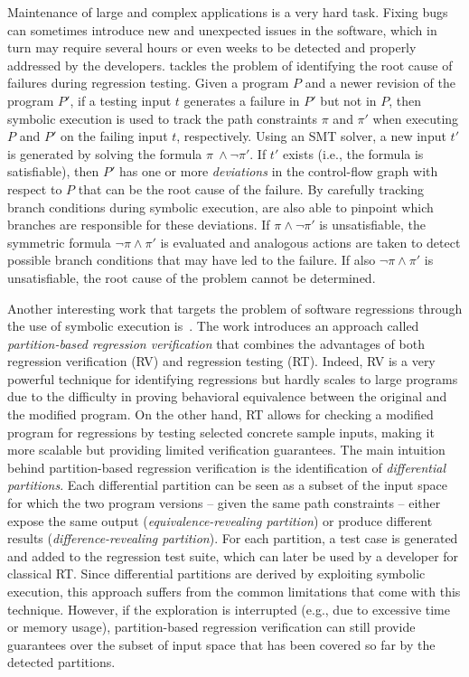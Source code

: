 \smallskip
Maintenance of large and complex applications is a very hard task. Fixing bugs can sometimes introduce new and unexpected issues in the software, which in turn may require several hours or even weeks to be detected and properly addressed by the developers. \cite{QRL-TOSEM12} tackles the problem of identifying the root cause of failures during regression testing. Given a program $P$ and a newer revision of the program $P'$, if a testing input $t$ generates a failure in $P'$ but not in  $P$, then symbolic execution is used to track the path constraints $\pi$ and $\pi'$ when executing $P$ and $P'$ on the failing input $t$, respectively. Using an SMT solver, a new input $t'$ is generated by solving the formula $\pi ~\wedge \neg\pi'$. If $t'$ exists (i.e., the formula is satisfiable), then $P'$ has one or more {\em deviations} in the control-flow graph with respect to $P$ that can be the root cause of the failure. By carefully tracking branch conditions during symbolic execution, \cite{QRL-TOSEM12} are also able to pinpoint which branches are responsible for these deviations. If $\pi \wedge \neg\pi'$ is unsatisfiable, the symmetric formula $\neg\pi \wedge \pi'$ is evaluated and analogous actions are taken to detect possible branch conditions that may have led to the failure. If also $\neg\pi \wedge \pi'$ is unsatisfiable, the root cause of the problem cannot be determined.

Another interesting work that targets the problem of software regressions through the use of symbolic execution is~\cite{BOR-ICSE13}. The work introduces an approach called {\em partition-based regression verification} that combines the advantages of both regression verification (RV) and regression testing (RT). Indeed, RV is a very powerful technique for identifying regressions but hardly scales to large programs due to the difficulty in proving behavioral equivalence between the original and the modified program. On the other hand, RT allows for checking a modified program for regressions by testing selected concrete sample inputs, making it more scalable but providing limited verification guarantees. The main intuition behind partition-based regression verification is the identification of {\em differential partitions}. Each differential partition can be seen as a subset of the input space for which the two program versions -- given the same path constraints -- either expose the same output ({\em equivalence-revealing partition}) or produce different results ({\em difference-revealing partition}). For each partition, a test case is generated and added to the regression test suite, which can later be used by a developer for classical RT. Since differential partitions are derived by exploiting symbolic execution, this approach suffers from the common limitations that come with this technique. However, if the exploration is interrupted (e.g., due to excessive time or memory usage), partition-based regression verification can still provide guarantees over the subset of input space that has been covered so far by the detected partitions.

